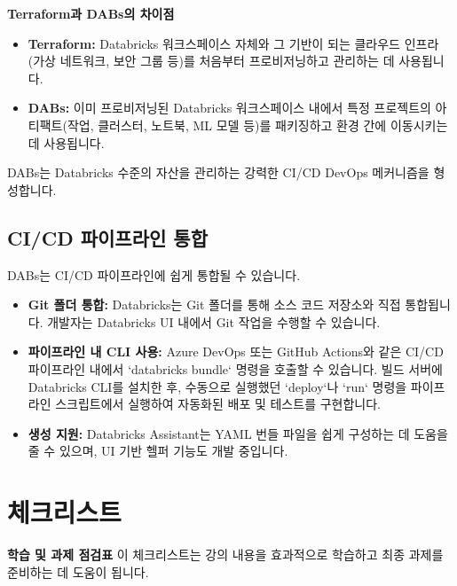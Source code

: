 \documentclass[11pt,a4paper]{article}
\begin{document}
\begin{warningbox}
\textbf{Terraform과 DABs의 차이점}
\begin{itemize}
    \item \textbf{Terraform:} Databricks 워크스페이스 자체와 그 기반이 되는 클라우드 인프라(가상 네트워크, 보안 그룹 등)를 처음부터 프로비저닝하고 관리하는 데 사용됩니다.
    \item \textbf{DABs:} 이미 프로비저닝된 Databricks 워크스페이스 내에서 특정 프로젝트의 아티팩트(작업, 클러스터, 노트북, ML 모델 등)를 패키징하고 환경 간에 이동시키는 데 사용됩니다.
\end{itemize}
DABs는 Databricks 수준의 자산을 관리하는 강력한 CI/CD DevOps 메커니즘을 형성합니다.
\end{warningbox}

\subsection{CI/CD 파이프라인 통합}
DABs는 CI/CD 파이프라인에 쉽게 통합될 수 있습니다.
\begin{itemize}
    \item \textbf{Git 폴더 통합:} Databricks는 Git 폴더를 통해 소스 코드 저장소와 직접 통합됩니다. 개발자는 Databricks UI 내에서 Git 작업을 수행할 수 있습니다.
    \item \textbf{파이프라인 내 CLI 사용:} Azure DevOps 또는 GitHub Actions와 같은 CI/CD 파이프라인 내에서 `databricks bundle` 명령을 호출할 수 있습니다. 빌드 서버에 Databricks CLI를 설치한 후, 수동으로 실행했던 `deploy`나 `run` 명령을 파이프라인 스크립트에서 실행하여 자동화된 배포 및 테스트를 구현합니다.
    \item \textbf{생성 지원:} Databricks Assistant는 YAML 번들 파일을 쉽게 구성하는 데 도움을 줄 수 있으며, UI 기반 헬퍼 기능도 개발 중입니다.
\end{itemize}

\newpage
\section{체크리스트}

\begin{summarybox}
\textbf{학습 및 과제 점검표}
이 체크리스트는 강의 내용을 효과적으로 학습하고 최종 과제를 준비하는 데 도움이 됩니다.
\end{summarybox}
\end{document}
